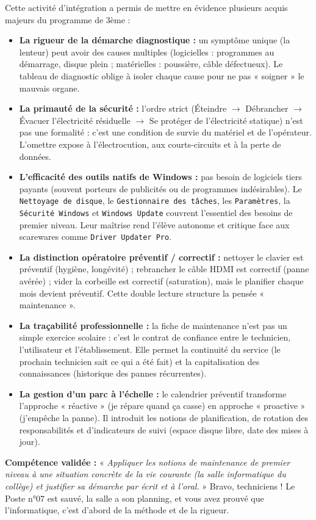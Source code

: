 \documentclass[11pt]{article}
\newcommand{\cle}[1]{{\popxbold\color{popdark}#1}}
\newcounter{popsec}
\newcounter{popsub}
\newcommand{\courssub}[1]{%
  \stepcounter{popsub}%
  \par\vspace{9pt}\noindent{\popxbold\fontsize{11.5}{13}\selectfont\color{popink}{\color{poporange}\thepopsec.\thepopsub}\hspace{6pt}#1}\par\nopagebreak\vspace{4pt}
}
\begin{document}
\courssub{Bilan de l'activité}
Cette activité d'intégration a permis de mettre en évidence plusieurs acquis majeurs du programme de 3ème :
\begin{itemize}
    \item \textbf{La rigueur de la démarche diagnostique :} un symptôme unique (la lenteur) peut avoir des causes multiples (logicielles : programmes au démarrage, disque plein ; matérielles : poussière, câble défectueux). Le tableau de diagnostic oblige à isoler chaque cause pour ne pas « soigner » le mauvais organe.
    \item \textbf{La primauté de la sécurité :} l'ordre strict (Éteindre $\rightarrow$ Débrancher $\rightarrow$ Évacuer l'électricité résiduelle $\rightarrow$ Se protéger de l'électricité statique) n'est pas une formalité : c'est une condition de survie du matériel et de l'opérateur. L'omettre expose à l'électrocution, aux courts-circuits et à la perte de données.
    \item \textbf{L'efficacité des outils natifs de Windows :} pas besoin de logiciels tiers payants (souvent porteurs de publicités ou de programmes indésirables). Le \texttt{Nettoyage de disque}, le \texttt{Gestionnaire des tâches}, les \texttt{Paramètres}, la \texttt{Sécurité Windows} et \texttt{Windows Update} couvrent l'essentiel des besoins de premier niveau. Leur maîtrise rend l'élève autonome et critique face aux scarewares comme \texttt{Driver Updater Pro}.
    \item \textbf{La distinction opératoire préventif / correctif :} nettoyer le clavier est préventif (hygiène, longévité) ; rebrancher le câble HDMI est correctif (panne avérée) ; vider la corbeille est correctif (saturation), mais le planifier chaque mois devient préventif. Cette double lecture structure la pensée « maintenance ».
    \item \textbf{La traçabilité professionnelle :} la fiche de maintenance n'est pas un simple exercice scolaire : c'est le contrat de confiance entre le technicien, l'utilisateur et l'établissement. Elle permet la continuité du service (le prochain technicien sait ce qui a été fait) et la capitalisation des connaissances (historique des pannes récurrentes).
    \item \textbf{La gestion d'un parc à l'échelle :} le calendrier préventif transforme l'approche « réactive » (je répare quand ça casse) en approche « proactive » (j'empêche la panne). Il introduit les notions de \cle{planification}, de rotation des responsabilités et d'\cle{indicateurs} de suivi (espace disque libre, date des mises à jour).
\end{itemize}
\textbf{Compétence validée :} « \emph{Appliquer les notions de maintenance de premier niveau à une situation concrète de la vie courante (la salle informatique du collège) et justifier sa démarche par écrit et à l'oral.} » \cle{Bravo, techniciens !} Le Poste n°07 est sauvé, la salle a son planning, et vous avez prouvé que l'informatique, c'est d'abord de la méthode et de la rigueur.
\end{document}
